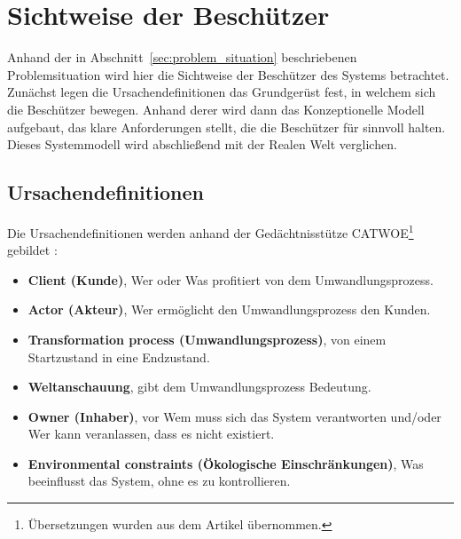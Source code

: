 \documentclass[11pt,a4paper]{report}
\begin{document}

\section{Sichtweise der Beschützer} 

Anhand der in Abschnitt~\ref{sec:problem_situation} beschriebenen Problemsituation wird hier die Sichtweise der Beschützer des Systems betrachtet. Zunächst legen die Ursachendefinitionen das Grundgerüst fest, in welchem sich die Beschützer bewegen. Anhand derer wird dann das Konzeptionelle Modell aufgebaut, das klare Anforderungen stellt, die die Beschützer für sinnvoll halten. Dieses Systemmodell wird abschließend mit der Realen Welt verglichen.

\subsection{Ursachendefinitionen}

Die Ursachendefinitionen werden anhand der Gedächtnisstütze CATWOE\footnote{Übersetzungen wurden aus dem Artikel \cite{ssmger} übernommen.} gebildet \cite{bobwill}:

\begin{itemize}[leftmargin=*]
\item \textbf{Client (Kunde)}, Wer oder Was profitiert von dem Umwandlungsprozess.
\item \textbf{Actor (Akteur)}, Wer ermöglicht den Umwandlungsprozess den Kunden.
\item \textbf{Transformation process (Umwandlungsprozess)}, von einem Startzustand in eine Endzustand.
\item \textbf{Weltanschauung}, gibt dem Umwandlungsprozess Bedeutung.
\item \textbf{Owner (Inhaber)}, vor Wem muss sich das System verantworten und/oder Wer kann veranlassen, dass es nicht existiert.
\item \textbf{Environmental constraints (Ökologische Einschränkungen)}, Was beeinflusst das System, ohne es zu kontrollieren.
\end{itemize}
\end{document}
